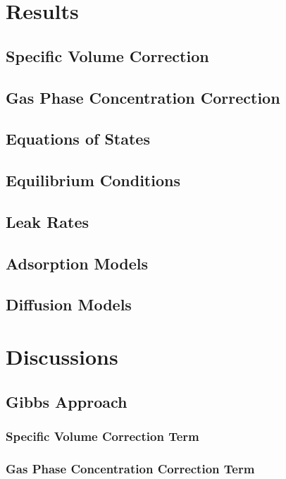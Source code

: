 \documentclass[11pt]{article}
\begin{document}
\section{Results}
\label{sec:org304d5ea}
\subsection{Specific Volume Correction}
\label{sec:org0636dd9}
\subsection{Gas Phase Concentration Correction}
\label{sec:org31e3297}
\subsection{Equations of States}
\label{sec:orgf2abfb6}
\subsection{Equilibrium Conditions}
\label{sec:orgaf6d6ad}
\subsection{Leak Rates}
\label{sec:org15f6f56}
\subsection{Adsorption Models}
\label{sec:org837c5fe}
\subsection{Diffusion Models}
\label{sec:orgb8e4be9}
\section{Discussions}
\label{sec:orgfa9443c}
\subsection{Gibbs Approach}
\label{sec:org1b3f61e}
\subsubsection{Specific Volume Correction Term}
\label{sec:org068e80b}
\subsubsection{Gas Phase Concentration Correction Term}
\label{sec:orgddb3c11}
\end{document}
